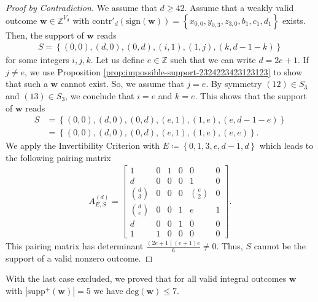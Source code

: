 \begin{proof}[Proof by Contradiction]
    We assume that \( d \geq 42 \). Assume that a weakly valid outcome \( \mathbf{w} \in \mathbb{Z}^{V_d} \) with \( \mathrm{contr}'_d(\mathrm{sign}(\mathbf{w})) =  \left\{ x_{0,0}, y_{0,3}, z_{3,0}, b_1, c_1, d_1 \right\} \) exists. Then, the support of \( \mathbf{w} \) reads 
    \begin{align*}
        S = \left\{ (0,0), (d,0), (0,d), (i,1), (1,j), (k, d-1-k) \right\}
    \end{align*}
    for some integers \( i,j, k \). Let us define \( e \in \mathbb{Z} \) such that we can write \( d = 2e + 1 \). If \( j \neq e \), we use Proposition \ref{prop:impossible-support-2324223423123123} to show that such a \( \mathbf{w} \) cannot exist. So, we assume that \( j = e \). By symmetry \( (12) \in S_3 \) and \( (13) \in S_3 \), we conclude that \( i = e \) and \( k = e \). This shows that the support of \( \mathbf{w} \) reads
    \begin{align*}
        S &= \left\{ (0,0), (d,0), (0,d), (e,1), (1,e), (e, d-1-e) \right\} \\&= \left\{ (0,0), (d,0), (0,d), (e,1), (1,e), (e,e) \right\}.
    \end{align*}
    We apply the Invertibility Criterion with \( E \coloneqq \left\{ 0,1,3,e,d-1,d \right\}\) which leads to the following pairing matrix 
    \begin{align*}
        A^{(d)}_{E,S} = \begin{bmatrix}
            1 & 0 & 1 & 0 & 0 & 0 \\
            d & 0 & 0 & 0 & 1 & 0 \\
            \binom{d}{3} & 0 & 0 & 0 & \binom{e}{2} & 0 \\
            \binom{d}{e} & 0 & 0 & 1 & e & 1 \\
            d & 0 & 0 & 1 & 0 & 0 \\
            1 & 1 & 0 & 0 & 0 & 0
        \end{bmatrix}.
    \end{align*}
    This pairing matrix has determinant \( \frac{(2e + 1)(e + 1)e}{6} \neq 0 \). Thus, \( S \) cannot be the support of a valid nonzero outcome.
\end{proof}

With the last case excluded, we proved that for all valid integral outcomes \( \mathbf w \) with \( |\mathrm{supp}^+(\mathbf w)| = 5 \) we have \( \mathrm{deg}(\mathbf w) \leq 7 \).